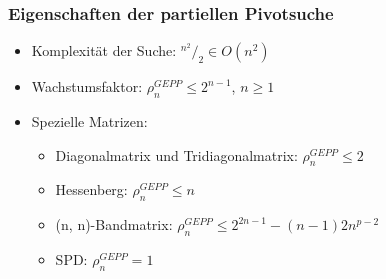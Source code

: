 \documentclass[10pt]{beamer} %
\begin{document}
\begin{frame}[fragile]
	\frametitle{Eigenschaften der partiellen Pivotsuche}
	\begin{itemize}[<+->]
		\item Komplexität der Suche: $^{n^{2}}/_{2} \in O(n^2)$
		\vspace*{1em}
		\item Wachstumsfaktor: $\rho_{n}^{GEPP} \leq 2^{n-1}$, $n \geq 1$
		\vspace*{1em}
		\item Spezielle Matrizen:
		\vspace*{1em}
		\begin{itemize}[<+->]
			\item Diagonalmatrix und Tridiagonalmatrix: $\rho_{n}^{GEPP} \leq 2$
			\vspace*{1em}
			\item Hessenberg: $\rho_{n}^{GEPP} \leq n$
			\vspace*{1em}
			\item (n, n)-Bandmatrix: $\rho_{n}^{GEPP} \leq 2^{2n-1} - (n-1)2n^{p-2}$
			\vspace*{1em}
			\item SPD: $\rho_{n}^{GEPP} = 1$
			\end{itemize}
	\end{itemize}
\end{frame}
\end{document}
